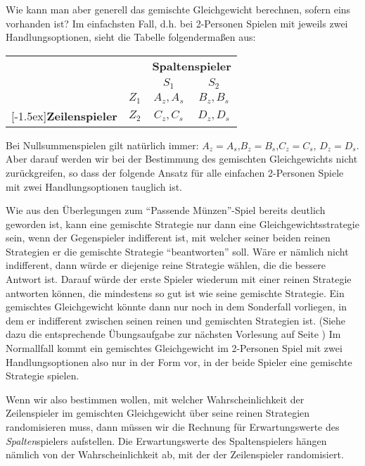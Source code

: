 Wie kann man aber generell das gemischte Gleichgewicht berechnen, sofern eins
vorhanden ist? Im einfachsten Fall, d.h. bei 2-Personen Spielen mit jeweils zwei
Handlungsoptionen, sieht die Tabelle folgendermaßen aus:

\begin{center}
\begin{tabular}{cc|c|c|}
& \multicolumn{1}{c}{} & \multicolumn{2}{c}{\bf Spaltenspieler} \\
& \multicolumn{1}{c}{} & \multicolumn{1}{c}{$S_1$} & \multicolumn{1}{c}{$S_2$}
\\ \cline{3-4} 
& $Z_1$                 & $A_z, A_s$          &  $B_z, B_s$   \\
\cline{3-4}
\raisebox{1.5ex}[-1.5ex]{{\bf Zeilenspieler}} 
& $Z_2$                 & $C_z, C_s$          &  $D_z, D_s$  \\
\cline{3-4}
\end{tabular}
\end{center}

Bei Nullsummenspielen gilt natürlich immer: $A_z = A_s$,$B_z = B_s$,$C_z = C_s$,
$D_z = D_s$. Aber darauf werden wir bei der Bestimmung des gemischten
Gleichgewichts nicht zurückgreifen, so dass der folgende Ansatz für alle
einfachen 2-Personen Spiele mit zwei Handlungsoptionen tauglich ist. 

Wie aus den Überlegungen zum "`Passende Münzen"'-Spiel bereits deutlich
geworden ist, kann eine gemischte Strategie nur dann eine
Gleichgewichtsstrategie sein, wenn der Gegenspieler indifferent ist, mit
welcher seiner beiden reinen Strategien er die gemischte Strategie
"`beantworten"' soll. Wäre er nämlich nicht indifferent, dann würde er
diejenige reine Strategie wählen, die die bessere Antwort ist. Darauf würde der
erste Spieler wiederum mit einer reinen Strategie antworten können, die
mindestens so gut ist wie seine gemischte Strategie. Ein gemischtes
Gleichgewicht könnte dann nur noch in dem Sonderfall vorliegen, in dem er
indifferent zwischen seinen reinen und gemischten Strategien ist. (Siehe dazu
die entsprechende Übungsaufgabe zur nächsten Vorlesung auf Seite
\pageref{gemischteStrategienAufgabe}) Im Normallfall kommt ein gemischtes
Gleichgewicht im 2-Personen Spiel mit zwei Handlungsoptionen also nur in der
Form vor, in der beide Spieler eine gemischte Strategie spielen.

Wenn wir also bestimmen wollen, mit welcher Wahrscheinlichkeit der
Zeilenspieler im gemischten Gleichgewicht über seine reinen Strategien
randomisieren muss, dann müssen wir die Rechnung für Erwartungswerte des {\em
Spalten}spielers aufstellen. Die Erwartungswerte des Spaltenspielers hängen
nämlich von der Wahrscheinlichkeit ab, mit der der Zeilenspieler randomisiert.

